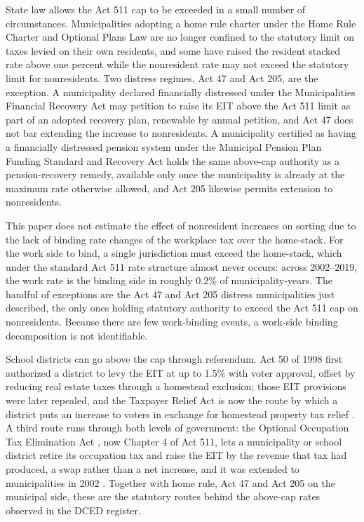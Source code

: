\documentclass[12pt]{article}
\begin{document}
State law allows the Act 511 cap to be exceeded in a small number of
circumstances. Municipalities adopting a home
rule charter under the Home Rule Charter and Optional Plans Law
\citep{paHomeRule} are no longer confined to the statutory limit on taxes
levied on their own residents, and some have raised the resident stacked rate
above one percent while the nonresident rate may not exceed the statutory limit for nonresidents.
Two distress regimes, Act 47 and Act 205, are the exception. A
municipality declared financially distressed under the Municipalities
Financial Recovery Act
\citep[Act 47 of 1987;][]{paAct47_1987} may petition to raise its EIT above the Act 511 limit as part of an adopted
recovery plan, renewable by annual petition, and Act 47 does not bar
extending the increase to nonresidents. A municipality certified as
having a financially distressed pension system under the Municipal
Pension Plan Funding Standard and Recovery Act
\citep[Act 205 of 1984;][]{paAct205_1984} holds the same above-cap
authority as a pension-recovery remedy, available only once the
municipality is already at the maximum rate otherwise allowed, and
Act 205 likewise permits extension to nonresidents.

This paper does not estimate the effect of nonresident increases on sorting due to the lack of binding rate changes of the workplace tax over the home-stack. For the work side to bind, a single jurisdiction must exceed the home-stack, which under the standard Act 511 rate structure almost never occurs: across 2002–2019, the work rate is the binding side in roughly $0.2\%$ of municipality-years. The handful of exceptions are the Act 47 and Act 205 distress municipalities just described, the only ones holding statutory authority to exceed the Act 511 cap on nonresidents. Because there are few work-binding events, a work-side binding decomposition is not identifiable.

School districts can go above the cap through referendum. Act 50 of 1998
\citep{paAct50_1998} first authorized a district to levy the EIT at up to
1.5\% with voter approval, offset by reducing real estate taxes through a
homestead exclusion; those EIT provisions were later repealed, and the
Taxpayer Relief Act \citep[Act 1 of 2006;][]{paAct1_2006} is now the route
by which a district puts an increase to voters in exchange for homestead
property tax relief \citep{paDeskbook2025}. A third route runs through both
levels of government: the Optional Occupation Tax Elimination Act
\citep[Act 24 of 2001;][]{paAct24_2001}, now Chapter 4 of Act 511, lets a
municipality or school district retire its occupation tax and raise the EIT
by the revenue that tax had produced, a swap rather than a net increase, and
it was extended to municipalities in 2002
\citep{shapiroCommonwealthPennsylvaniaa}. Together with home rule, Act 47 and
Act 205 on the municipal side, these are the statutory routes behind the
above-cap rates observed in the DCED register.
\end{document}
